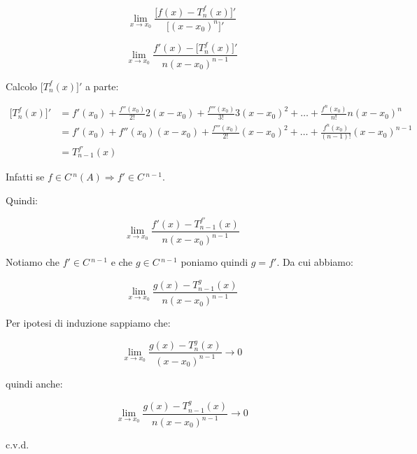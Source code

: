 \documentclass[../dimostrazioni]{subfiles}
\begin{document}
        \[  \lim_{x \to x_0} \frac{\Big[f(x)-T _n ^ f (x)\Big]'}{\Big[(x-x_0)^n\Big]'}    \]

        \[  \lim_{x \to x_0} \frac{f'(x)-\Big[T _n ^ f (x)\Big]'}{n(x-x_0)^{n-1}}    \]

        Calcolo \(\Big[T _n ^ f (x)\Big]'\) a parte:

        \begin{align*}
            \Big[T _n ^ f (x)\Big]' &= f'(x_0) + \frac{f''(x_0)}{2!}2(x-x_0) + \frac{f'''(x_0)}{3!}3(x-x_0)^2 + \dots + \frac{f^n(x_0)}{n!}n(x-x_0)^n \\
                                    &= f'(x_0) + f''(x_0)(x-x_0) + \frac{f'''(x_0)}{2!}(x-x_0)^2 + \dots + \frac{f^n(x_0)}{(n-1)!}(x-x_0)^{n-1} \\
                                    &= T_{n-1} ^{f'} (x)
        \end{align*}

        Infatti se \(f \in C\,^n (A) \Rightarrow f' \in C\,^{n-1} \).

        Quindi:

        \[  \lim_{x \to x_0} \frac{f'(x)-T_{n-1} ^{f'} (x)}{n(x-x_0)^{n-1}}    \]

        Notiamo che \(f' \in C\,^{n-1}\) e che \(g \in C\,^{n-1}\) poniamo quindi \(g = f'\). Da cui abbiamo:

        \[  \lim_{x \to x_0} \frac{g(x)-T_{n-1} ^{g} (x)}{n(x-x_0)^{n-1}}    \]

        Per ipotesi di induzione sappiamo che:

        \[  \lim_{x \to x_0} \frac{g(x) - T _n ^ g (x)}{(x-x_0)^{n-1}} \rightarrow 0 \]

        quindi anche:

        \[  \lim_{x \to x_0} \frac{g(x)-T_{n-1} ^{g} (x)}{n(x-x_0)^{n-1}}  \rightarrow 0  \]

        c.v.d.

        
\end{document}

